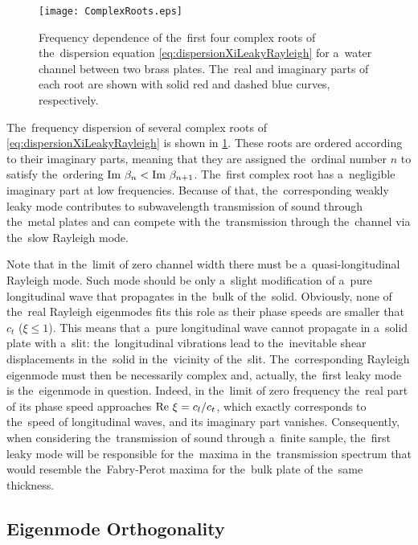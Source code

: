\begin{figure}
\begin{center}
\texttt{[image: ComplexRoots.eps]}
\caption{Frequency dependence of the~first four complex roots of the~dispersion equation \cref{eq:dispersionXiLeakyRayleigh} for a~water channel between two brass plates. The~real and imaginary parts of each root are shown with solid red and dashed blue curves, respectively.}
\label{fig:roots}
\end{center}
\end{figure}


The~frequency dispersion of several complex roots of \cref{eq:dispersionXiLeakyRayleigh} is shown in \cref{fig:roots}.
These roots are ordered according to their imaginary parts, meaning that they are assigned the~ordinal number $n$ to satisfy the~ordering $
\textrm{Im }\beta_{n} < \textrm{Im }\beta_{n+1}$.
The~first complex root has a~negligible imaginary part at low frequencies.
Because of that, the~corresponding weakly leaky mode contributes to subwavelength transmission of sound through the~metal plates and can compete with the~transmission through the~channel via the~slow Rayleigh mode.

Note that in the~limit of zero channel width there must be a~quasi-longitudinal Rayleigh mode.
Such mode should be only a~slight modification of a~pure longitudinal wave that propagates in the~bulk of the~solid.
Obviously, none of the~real Rayleigh eigenmodes fits this role as their phase speeds are smaller that $c_t$ ($\xi \le 1$).
This means that a~pure longitudinal wave cannot propagate in a~solid plate with a~slit: the~longitudinal vibrations lead to the~inevitable shear displacements in the~solid in the~vicinity of the~slit.
The~corresponding Rayleigh eigenmode must then be necessarily complex and, actually, the~first leaky mode is the~eigenmode in question.
Indeed, in the~limit of zero frequency the~real part of its phase speed approaches $\textrm{Re }\xi = c_l/c_t$, which exactly corresponds to the~speed of longitudinal waves, and its imaginary part vanishes.
Consequently, when considering the~transmission of sound through a~finite sample, the~first leaky mode will be responsible for the~maxima in the~transmission spectrum that would resemble the~Fabry-Perot maxima for the~bulk plate of the~same thickness.

\subsection{Eigenmode Orthogonality}

